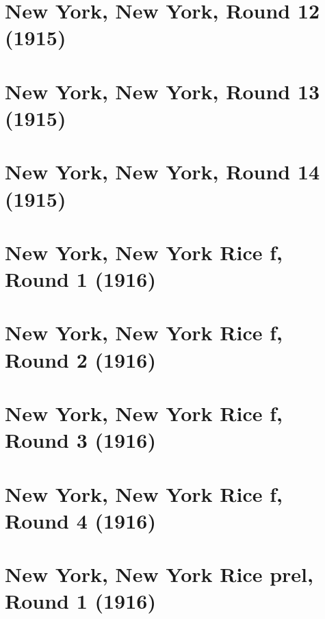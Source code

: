 \documentclass[11pt]{article}
\begin{document}
\clearpage

\section{New York, New York, Round 12 (1915)}


\clearpage

\section{New York, New York, Round 13 (1915)}


\clearpage

\section{New York, New York, Round 14 (1915)}


\clearpage

\section{New York, New York Rice f, Round 1 (1916)}


\clearpage

\section{New York, New York Rice f, Round 2 (1916)}


\clearpage

\section{New York, New York Rice f, Round 3 (1916)}


\clearpage

\section{New York, New York Rice f, Round 4 (1916)}


\clearpage

\section{New York, New York Rice prel, Round 1 (1916)}

\end{document}
